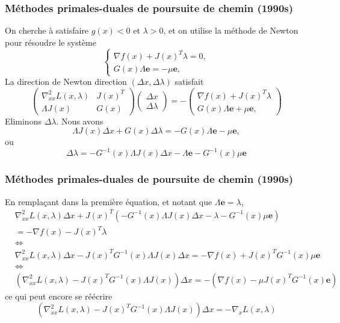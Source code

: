 \documentclass[usepdftitle=false]{beamer}
\def\be{\boldsymbol{e}}
\begin{document}
\begin{frame}
\frametitle{Méthodes primales-duales de poursuite de chemin (1990s)}

On cherche à satisfaire $g(x) < 0$ et $\lambda > 0$, et on utilise la méthode de Newton pour résoudre le système
$$
\begin{cases}
\nabla f(x) + J(x)^T\lambda = 0, \\
G(x)\Lambda\be = -\mu\be,
\end{cases}
$$
La direction de Newton direction $(\Delta x, \Delta \lambda)$ satisfait
$$
\begin{pmatrix}
\nabla^2_{xx} L(x, \lambda) &  J(x)^T \\
\Lambda J(x) & G(x)
\end{pmatrix}
\begin{pmatrix}
\Delta x \\ \Delta \lambda
\end{pmatrix}
= -
\begin{pmatrix}
\nabla f(x) + J(x)^T\lambda \\
G(x)\Lambda\be + \mu\be,
\end{pmatrix}
$$
Eliminons $\Delta \lambda$. Nous avons
$$
\Lambda J(x) \Delta x + G(x) \Delta \lambda
= - G(x)\Lambda\be - \mu\be,
$$
ou
$$
\Delta \lambda = - G^{-1}(x) \Lambda J(x) \Delta x - \Lambda\be - G^{-1}(x) \mu\be
$$

\end{frame}

\begin{frame}
\frametitle{Méthodes primales-duales de poursuite de chemin (1990s)}

En remplaçant dans la première équation, et notant que $\Lambda \be = \lambda$,
\begin{align*}
& \nabla^2_{xx} L(x, \lambda) \Delta x + J(x)^T (- G^{-1}(x) \Lambda J(x) \Delta x - \lambda - G^{-1}(x) \mu\be) \\
&=  - \nabla f(x) - J(x)^T\lambda \\
&\Leftrightarrow \\
& \nabla^2_{xx} L(x, \lambda) \Delta x - J(x)^TG^{-1}(x) \Lambda J(x) \Delta x =  - \nabla f(x) + J(x)^TG^{-1}(x) \mu\be \\
&\Leftrightarrow \\
& ( \nabla^2_{xx} L(x, \lambda) - J(x)^TG^{-1}(x) \Lambda J(x)) \Delta x =  - (\nabla f(x) - \mu J(x)^TG^{-1}(x)\be)
\end{align*}
ce qui peut encore se réécrire
$$
( \nabla^2_{xx} L(x, \lambda) - J(x)^TG^{-1}(x) \Lambda J(x)) \Delta x =  -\nabla_x L(x,\lambda)
$$

\end{frame}
\end{document}
